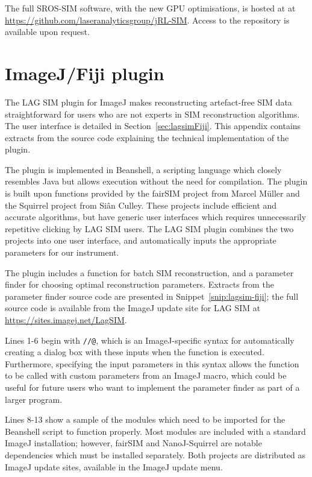 The full SROS-SIM software, with the new GPU optimisations, is hosted at at \url{https://github.com/laseranalyticsgroup/jRL-SIM}. Access to the repository is available upon request. 


\section{ImageJ/Fiji plugin} \label{appx:fiji-lagsim}
The LAG SIM plugin for ImageJ makes reconstructing artefact-free SIM data straightforward for users who are not experts in SIM reconstruction algorithms. 
The user interface is detailed in Section~\ref{sec:lagsimFiji}. 
This appendix contains extracts from the source code explaining the technical implementation of the plugin. 

The plugin is implemented in Beanshell, a scripting language which closely resembles Java but allows execution without the need for compilation. 
The plugin is built upon functions provided by the fairSIM project from Marcel M{\"u}ller and the Squirrel project from Si{\^a}n Culley. 
These projects include efficient and accurate algorithms, but have generic user interfaces which requires unnecessarily repetitive clicking by LAG SIM users. 
The LAG SIM plugin combines the two projects into one user interface, and automatically inputs the appropriate parameters for our instrument. 

The plugin includes a function for batch SIM reconstruction, and a parameter finder for choosing optimal reconstruction parameters. 
Extracts from the parameter finder source code are presented in Snippet~\ref{snip:lagsim-fiji}; the full source code is available from the ImageJ update site for LAG SIM at \url{https://sites.imagej.net/LagSIM}. 

Lines 1-6 begin with \texttt{//@}, which is an ImageJ-specific syntax for automatically creating a dialog box with these inputs when the function is executed. 
Furthermore, specifying the input parameters in this syntax allows the function to be called with custom parameters from an ImageJ macro, which could be useful for future users who want to implement the parameter finder as part of a larger program. 

Lines 8-13 show a sample of the modules which need to be imported for the Beanshell script to function properly. 
Most modules are included with a standard ImageJ installation; however, fairSIM and NanoJ-Squirrel are notable dependencies which must be installed separately. 
Both projects are distributed as ImageJ update sites, available in the ImageJ update menu. 

